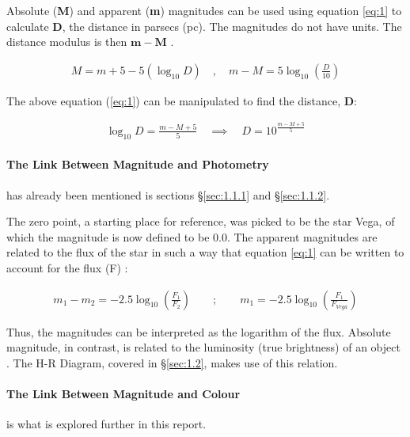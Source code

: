\documentclass[12pt]{article}
\begin{document}
Absolute (\textbf{M}) and apparent (\textbf{m}) magnitudes can be used using equation \ref{eq:1} to calculate \textbf{D}, the distance in parsecs (pc). The magnitudes do not have units.
The distance modulus is then $\mathbf{m - M}$
\cite{cosmosabsmag}.

\vspace{-1.5ex}
\begin{gather} \label{eq:1}
    M = m + 5 - 5 (\log_{10} D) \quad , \quad m - M = 5 \log_{10} \left( \frac{D}{10} \right)
\end{gather}

The above equation (\ref{eq:1}) can be manipulated to find the distance, \textbf{D}:

\vspace{-1.5ex}
\begin{gather} \label{eq:2}
    \log_{10}D = \frac{m - M + 5}{5} \quad \implies \quad D = 10^{\frac{m - M + 5}{5}}
\end{gather}

\paragraph{The Link Between Magnitude and Photometry} \label{sec:1.1.3.1} has already been mentioned is sections §\ref{sec:1.1.1} and §\ref{sec:1.1.2}.

The zero point, a starting place for reference, was picked to be the star Vega, of which the magnitude is now defined to be $0.0$.
The apparent magnitudes are related to the flux of the star in such a way that equation \ref{eq:1} can be written to account for the flux (F) \cite{ccds}:

\vspace{-1.5ex}
\begin{gather} \label{eq:3}
    m_1 - m_2 = -2.5 \log_{10}\left(\frac{F_1}{F_2}\right) \qquad ; \qquad m_1 = -2.5 \log_{10}\left(\frac{F_1}{F_{Vega}}\right)
\end{gather}

Thus, the magnitudes can be interpreted as the logarithm of the flux.
Absolute magnitude, in contrast, is related to the luminosity (true brightness) of an object
\cite{ccds}.
The H-R Diagram, covered in §\ref{sec:1.2}, makes use of this relation.

\paragraph{The Link Between Magnitude and Colour} \label{sec:1.1.3.2} is what is explored further in this report.
\end{document}
